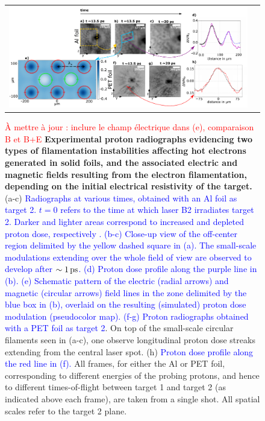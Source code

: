 \documentclass[aps,twocolumn,showpacs,superscriptaddress]{revtex4}
\begin{document}
\begin{figure}[tbh!]
\begin{tabular}{cc}
\includegraphics[scale = 0.6]{panel_v5.pdf}
\end{tabular}
 \caption{\label{fig:radio} 
\textcolor{red}{\`A mettre \`a jour : inclure le champ \'electrique dans (e),  comparaison B et B+E}
\textbf{Experimental proton radiographs evidencing two types of filamentation instabilities affecting hot electrons generated in solid foils, and the associated electric and magnetic fields resulting from the electron filamentation, depending on the initial electrical resistivity of the target.}
(a-c) \textcolor{blue}{Radiographs at various times, obtained with an Al foil as target 2. $t=0$ refers to the time at which laser B2 irradiates target 2. Darker and lighter areas correspond to increased and depleted proton dose, respectively \cite{RSI_Albertazzi_2015}. 
(b-c) Close-up view of the off-center region delimited by the yellow dashed square in (a). The small-scale modulations extending over the whole field of view are observed to develop after $\sim 1\,\rm ps$.
(d) Proton dose profile along the purple line in (b).
(e) Schematic pattern of the electric (radial arrows) and magnetic (circular arrows) field lines in the zone delimited by the blue box in (b), overlaid on the resulting (simulated) proton dose modulation (pseudocolor map). 
(f-g) Proton radiographs obtained with a PET foil as target 2}. On top of the small-scale circular filaments seen in (a-c), one observe longitudinal proton dose streaks extending from the central laser spot. 
(h) \textcolor{blue}{Proton dose profile along the red line in (f).}
All frames, for either the Al or PET foil, corresponding to different energies of the probing protons, and hence to different times-of-flight between target 1 and target 2 (as indicated above each frame), are taken from a single shot. All spatial scales refer to the target 2 plane.
}
\end{figure}
\end{document}
